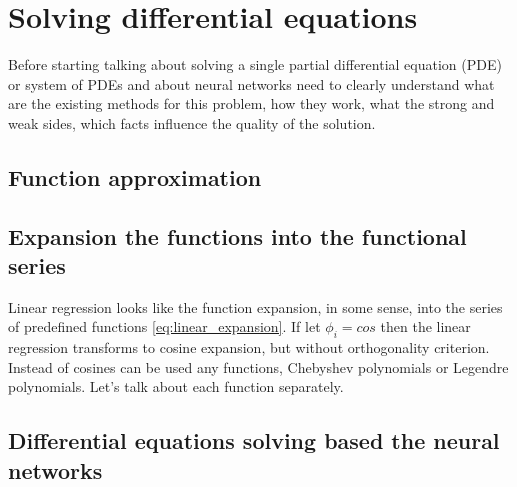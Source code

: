 \chapter{Solving differential equations}

Before starting talking about solving a single partial differential equation (PDE) or system of PDEs and about neural networks need to clearly understand what are the existing methods for this problem, how they work, what the strong and weak sides, which facts influence the quality of the solution. 

\section{Function approximation}




\newpage
\section{Expansion the functions into the functional series}
Linear regression looks like the function expansion, in some sense, into the series of predefined functions \eqref{eq:linear_expansion}. If let $\phi_i = cos$ then the linear regression transforms to cosine expansion, but without orthogonality criterion. Instead of cosines can be used any functions, Chebyshev polynomials or Legendre polynomials. 
Let's talk about each function separately.





\newpage
\section{Differential equations solving based the neural networks}


